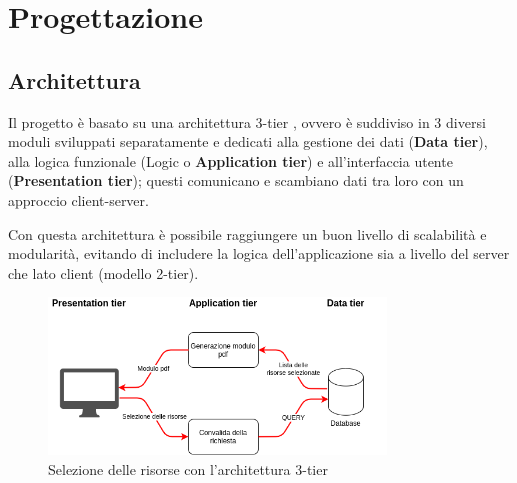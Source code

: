 
\chapter{Progettazione}


\section{Architettura} \label{sec:architettura}
Il progetto è basato su una architettura 3-tier \cite{wiki:3-tier-architecture},
ovvero è suddiviso in 3 diversi moduli sviluppati separatamente e dedicati alla
gestione dei dati (\textbf{Data tier}), alla logica funzionale (Logic o
\textbf{Application tier}) e all'interfaccia utente (\textbf{Presentation tier});
questi comunicano e scambiano dati tra loro con un approccio client-server.

Con questa architettura è possibile raggiungere un buon livello di scalabilità
e modularità, evitando di includere la logica dell’applicazione sia a livello del
server che lato client (modello 2-tier).

\begin{figure}[ht]
	\centering
	\includegraphics[width=0.8\textwidth]{assets/diagrams/3-tier-resources-selection.png}
	\caption{Selezione delle risorse con l'architettura 3-tier}
	\label{fig:3-tier-resources-selection}
\end{figure}

